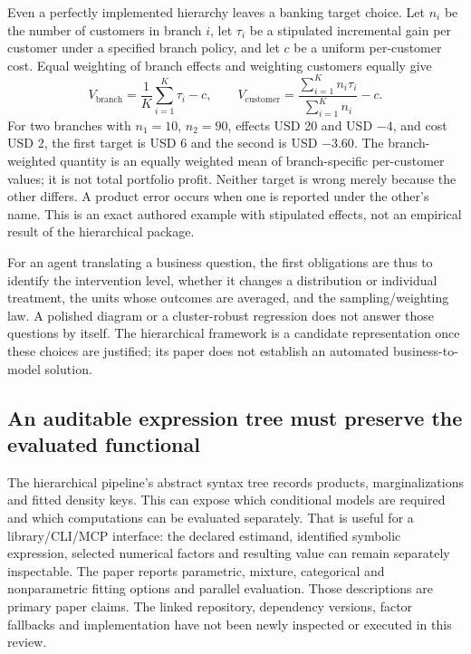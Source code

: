 Even a perfectly implemented hierarchy leaves a banking target choice. Let
$n_i$ be the number of customers in branch $i$, let $\tau_i$ be a
stipulated incremental gain per customer under a specified branch policy,
and let $c$ be a uniform per-customer cost. Equal weighting of branch
effects and weighting customers equally give
\begin{equation}
 V_{\mathrm{branch}}=\frac1K\sum_{i=1}^K\tau_i-c,\qquad
 V_{\mathrm{customer}}=\frac{\sum_{i=1}^K n_i\tau_i}{\sum_{i=1}^K n_i}-c.
 \label{exec23:structured-weights}
\end{equation}
For two branches with $n_1=10$, $n_2=90$, effects USD 20 and USD $-4$,
and cost USD 2, the first target is USD 6 and the second is USD $-3.60$.
The branch-weighted quantity is an equally weighted mean of branch-specific
per-customer values; it is not total portfolio profit. Neither target is
wrong merely because the other differs. A product error occurs when one is
reported under the other's name. This is an exact authored example with
stipulated effects, not an empirical result of the hierarchical package.
\citep{exec23_structured_reference}

For an agent translating a business question, the first obligations are thus
to identify the intervention level, whether it changes a distribution or
individual treatment, the units whose outcomes are averaged, and the
sampling/weighting law. A polished diagram or a cluster-robust regression
does not answer those questions by itself. The hierarchical framework is
a candidate representation once these choices are justified; its paper
does not establish an automated business-to-model solution.

\subsection{An auditable expression tree must preserve the evaluated functional}
\label{exec23:structured-ast}

The hierarchical pipeline's abstract syntax tree records products,
marginalizations and fitted density keys. This can expose which conditional
models are required and which computations can be evaluated separately.
That is useful for a library/CLI/MCP interface: the declared estimand,
identified symbolic expression, selected numerical factors and resulting
value can remain separately inspectable. The paper reports parametric,
mixture, categorical and nonparametric fitting options and parallel
evaluation. Those descriptions are primary paper claims. The linked
repository, dependency versions, factor fallbacks and implementation have
not been newly inspected or executed in this review.
\citep{exec23_hierarchical_pipeline}

